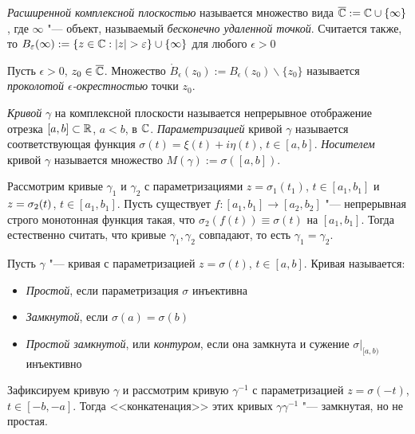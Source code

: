 \begin{definition}
	\textit{Расширенной комплексной плоскостью} называется множество вида $\overline{\mathbb{C}} := \mathbb{C} \cup \{\infty\}$, где $\infty$ "--- объект, называемый \textit{бесконечно удаленной точкой}. Считается также, то $B_{\varepsilon}(\infty) := \{z \in \mathbb{C}: |z| > \varepsilon\} \cup \{\infty\}$ для любого $\epsilon > 0$
\end{definition}

\begin{definition}
	Пусть $\epsilon > 0$, $z_0 \in \overline{\mathbb{C}}$. Множество $\mathring B_\epsilon(z_0) := B_\epsilon(z_0) \backslash \{z_0\}$ называется \textit{проколотой $\epsilon$-окрестностью} точки $z_0$.
\end{definition}

\begin{definition}
	\textit{Кривой} $\gamma$ на комплексной плоскости называется непрерывное отображение отрезка $[a, b] \subset \mathbb{R}$, $a < b$, в $\mathbb{C}$. \textit{Параметризацией} кривой $\gamma$ называется соответствующая 	функция $\sigma(t) = \xi(t) + i\eta(t)$, $t \in [a, b]$. \textit{Носителем} кривой $\gamma$ называется множество $M(\gamma) := \sigma([a, b])$. 
\end{definition}

\begin{note}
	Рассмотрим кривые $\gamma_1$ и $\gamma_2$ с параметризациями $z = \sigma_1(t_1)$, $t \in [a_1, b_1]$ и $z \hm= \sigma_2(t)$, $t \in [a_1, b_1]$. Пусть существует $f : [a_1, b_1] \to [a_2, b_2]$ "--- непрерывная строго монотонная функция такая, что $\sigma_2(f(t)) \equiv \sigma(t)$ на $[a_1, b_1]$. Тогда естественно считать, что кривые $\gamma_1, \gamma_2$ совпадают, то есть $\gamma_1 = \gamma_2$.
\end{note}

\begin{definition}
	Пусть $\gamma$ "--- кривая с параметризацией $z = \sigma(t)$, $t \in [a, b]$. Кривая называется:
	\begin{itemize}
		\item \textit{Простой}, если параметризация $\sigma$ инъективна
		\item \textit{Замкнутой}, если $\sigma(a) = \sigma(b)$
		\item \textit{Простой замкнутой}, или \textit{контуром}, если она замкнута и сужение $\sigma|_{[a, b)}$ инъективно
	\end{itemize}
\end{definition}

\begin{example}
	Зафиксируем кривую $\gamma$ и рассмотрим кривую $\gamma^{-1}$ с параметризацией $z = \sigma(-t)$, $t \in [-b, -a]$. Тогда <<конкатенация>> этих кривых $\gamma\gamma^{-1}$ "--- замкнутая, но не простая.
\end{example}

